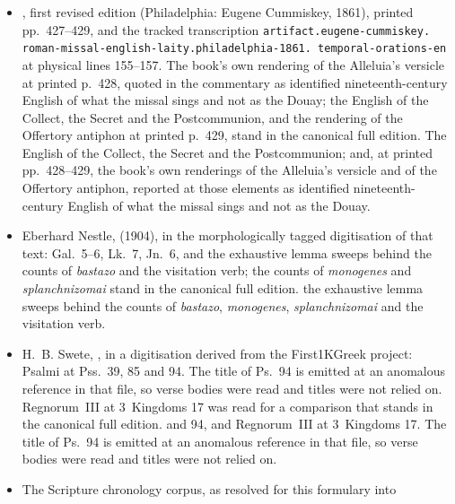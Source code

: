\begin{itemize}
concordance of the same edition; the English of every scriptural element
stands in the canonical full edition.%
\else
The English of every
scriptural element, with the Vulgate-to-English psalm conversions taken from the
tracked numbering concordance of the same edition.%
\fi{}
\item {}, first revised edition (Philadelphia: Eugene Cummiskey, 1861), printed
pp.~427--429, and the tracked transcription
\texttt{artifact.eugene-cummiskey.\allowbreak
roman-missal-english-laity.\allowbreak philadelphia-1861.\allowbreak
temporal-orations-en} at physical lines 155--157.
\ifdefined\TriptychSynthesisEdition
The book's own rendering of the Alleluia's versicle at printed p.~428, quoted
in the commentary as identified nineteenth-century English of what the missal
sings and not as the Douay; the English of the Collect, the Secret and the
Postcommunion, and the rendering of the Offertory antiphon at printed p.~429,
stand in the canonical full edition.%
\else
The English of the Collect, the
Secret and the Postcommunion; and, at printed pp.~428--429, the book's own
renderings of the Alleluia's versicle and of the Offertory antiphon, reported at
those elements as identified nineteenth-century English of what the missal
sings and not as the Douay.%
\fi{}
\item Eberhard Nestle,  (1904), in the
morphologically tagged digitisation of that text: Gal.\ 5--6, Lk.\ 7, Jn.\ 6, and
\ifdefined\TriptychSynthesisEdition
the exhaustive lemma sweeps behind the counts of \emph{bastazo} and the
visitation verb; the counts of \emph{monogenes} and \emph{splanchnizomai} stand
in the canonical full edition.%
\else
the exhaustive lemma sweeps behind the counts of \emph{bastazo},
\emph{monogenes}, \emph{splanchnizomai} and the visitation verb.%
\fi{}
\item H.~B. Swete, ,
in a digitisation derived from the First1KGreek project: Psalmi at Pss.\ 39, 85
\ifdefined\TriptychSynthesisEdition
and 94. The title of Ps.~94 is emitted at an
anomalous reference in that file, so verse bodies were read and titles were not
relied on. Regnorum~III at 3~Kingdoms 17 was read for a comparison that stands in
the canonical full edition.%
\else
and 94, and Regnorum~III at 3~Kingdoms 17. The title of Ps.~94 is emitted at an
anomalous reference in that file, so verse bodies were read and titles were not
relied on.%
\fi{}
\item The Scripture chronology corpus, as resolved for this formulary into

\end{itemize}
